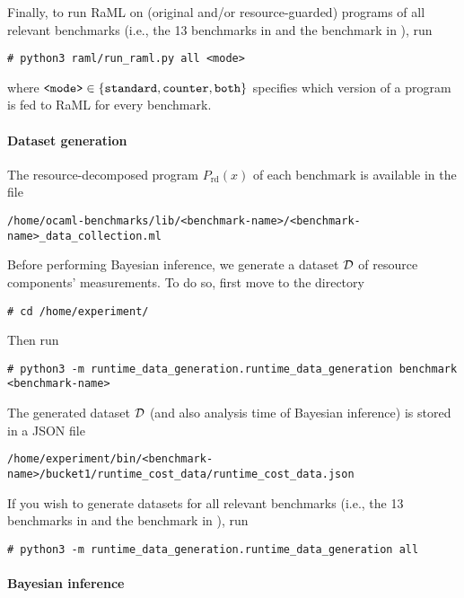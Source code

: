 Finally, to run RaML on (original and/or resource-guarded) programs of all
relevant benchmarks (i.e., the 13 benchmarks in
 and the benchmark \kruskal{} in
), run
\begin{verbatim}
# python3 raml/run_raml.py all <mode>
\end{verbatim}
where $\texttt{<mode>} \in \{ {\texttt{standard}, \texttt{counter},
    \texttt{both}} \}$ specifies which version of a program is fed to RaML for
every benchmark.

\paragraph{Dataset generation}

The resource-decomposed program $P_{\mathrm{rd}}(x)$ of each benchmark is
available in the file
\begin{verbatim}
/home/ocaml-benchmarks/lib/<benchmark-name>/<benchmark-name>_data_collection.ml
\end{verbatim}

Before performing Bayesian inference, we generate a dataset $\mathcal{D}$ of resource
components' measurements.
%
To do so, first move to the directory
\begin{verbatim}
# cd /home/experiment/
\end{verbatim}
%
Then run
\begin{verbatim}
# python3 -m runtime_data_generation.runtime_data_generation benchmark <benchmark-name>
\end{verbatim}
%
The generated dataset $\mathcal{D}$ (and also analysis time of Bayesian inference) is
stored in a JSON file
\begin{verbatim}
/home/experiment/bin/<benchmark-name>/bucket1/runtime_cost_data/runtime_cost_data.json
\end{verbatim}

If you wish to generate datasets for all relevant benchmarks (i.e., the 13
benchmarks in  and the benchmark
\quicksorttiml{} in ), run
\begin{verbatim}
# python3 -m runtime_data_generation.runtime_data_generation all
\end{verbatim}

\paragraph{Bayesian inference}


